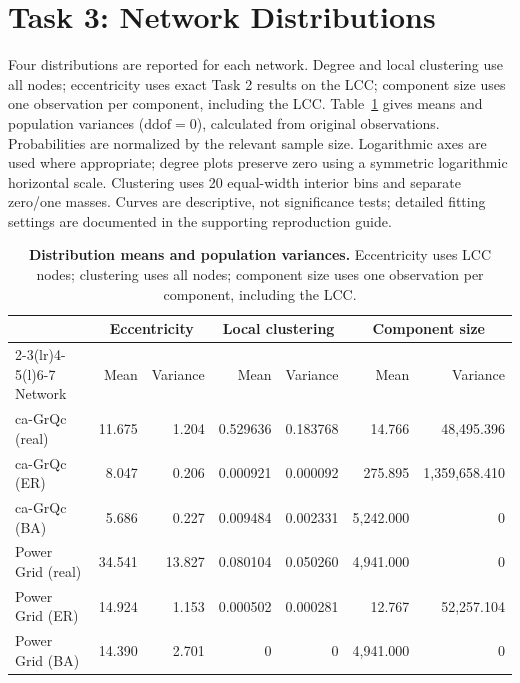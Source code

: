 
\section{Task 3: Network Distributions}
\begingroup
\setlength{\emergencystretch}{1em}
\setlength{\textfloatsep}{8pt}
\setlength{\intextsep}{7pt}

Four distributions are reported for each network. Degree and local clustering use all nodes; eccentricity uses exact Task 2 results on the LCC; component size uses one observation per component, including the LCC. Table~\ref{tab:distribution-summary} gives means and population variances ($\mathrm{ddof}=0$), calculated from original observations. Probabilities are normalized by the relevant sample size. Logarithmic axes are used where appropriate; degree plots preserve zero using a symmetric logarithmic horizontal scale. Clustering uses 20 equal-width interior bins and separate zero/one masses. Curves are descriptive, not significance tests; detailed fitting settings are documented in the supporting reproduction guide.

\begin{table}[!htbp]
\centering
\caption{\textbf{Distribution means and population variances.} Eccentricity uses LCC nodes; clustering uses all nodes; component size uses one observation per component, including the LCC.}
\label{tab:distribution-summary}
\small
\setlength{\tabcolsep}{3pt}
\begin{tabularx}{\linewidth}{@{}Xrrrrrr@{}}
\toprule
& \multicolumn{2}{c}{Eccentricity} & \multicolumn{2}{c}{Local clustering} & \multicolumn{2}{c}{Component size} \\
\cmidrule(lr){2-3}\cmidrule(lr){4-5}\cmidrule(l){6-7}
Network & Mean & Variance & Mean & Variance & Mean & Variance \\
\midrule
ca-GrQc (real) & 11.675 & 1.204 & 0.529636 & 0.183768 & 14.766 & 48,495.396 \\
ca-GrQc (ER) & 8.047 & 0.206 & 0.000921 & 0.000092 & 275.895 & 1,359,658.410 \\
ca-GrQc (BA) & 5.686 & 0.227 & 0.009484 & 0.002331 & 5,242.000 & 0 \\
Power Grid (real) & 34.541 & 13.827 & 0.080104 & 0.050260 & 4,941.000 & 0 \\
Power Grid (ER) & 14.924 & 1.153 & 0.000502 & 0.000281 & 12.767 & 52,257.104 \\
Power Grid (BA) & 14.390 & 2.701 & 0 & 0 & 4,941.000 & 0 \\
\bottomrule
\end{tabularx}
\end{table}



